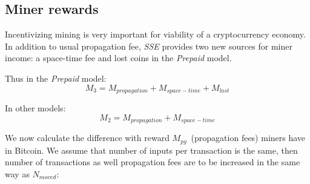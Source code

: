 \documentclass[]{article}   %
\newcommand{\esse}{\textit{SSE}}
\newcommand{\ignore}[1]{} %
\begin{document}
\ignore{
  and share of coins moved in a block:

  \begin{equation}
    M_{flow} \approx { N_{transactions} \cdot V_{output} \over N_{coins}} = {K \cdot B \over f_p}
  \end{equation}

  Thus, money flow may be controlled with \textit{K} parameter. This formula provide a way to estimate \textit{K} based on current Bitcoin statistics:

  \begin{equation}
    K={M_{flow} \cdot f_p \over B} \approx {10^{-9}} ({BTC / (Byte \cdot Block)})
  \end{equation}

  For a mean output size of 36 Bytes space-time fee part will exceed propagation fee after 5555 blocks or 38 days. 

  From money flow analysis we can find out how to use \esse{} model to control cryptocurrency money flow, changing space-time price and encourage active economy participants. Another money flow analysis result is the dependency between $L$ and $K$ \ref{eq:ltmean} that can particularly by used in the \textit{Scheduled payments} model to reduce number of model parameters.
}




\subsection{Miner rewards}
\label{minerrew}
Incentivizing mining is very important for viability of a cryptocurrency economy. 
In addition to usual propagation fee, \esse{} provides two new sources for miner income: a space-time fee and lost coins in the \textit{Prepaid} model.

Thus in the \textit{Prepaid} model:
\begin{equation}
M_{3} = M_{propagation} + M_{space-time} + M_{lost}
\end{equation}

In other models:
\begin{equation}
M_{2} = M_{propagation} + M_{space-time}
\end{equation}

We now calculate the difference with reward $M_{pg}$~(propagation fees) miners have in Bitcoin. We assume that number of inputs per transaction is the same, then number of transactions as well propagation fees are to be increased in the same way as $N_{moved}$:
\end{document}
